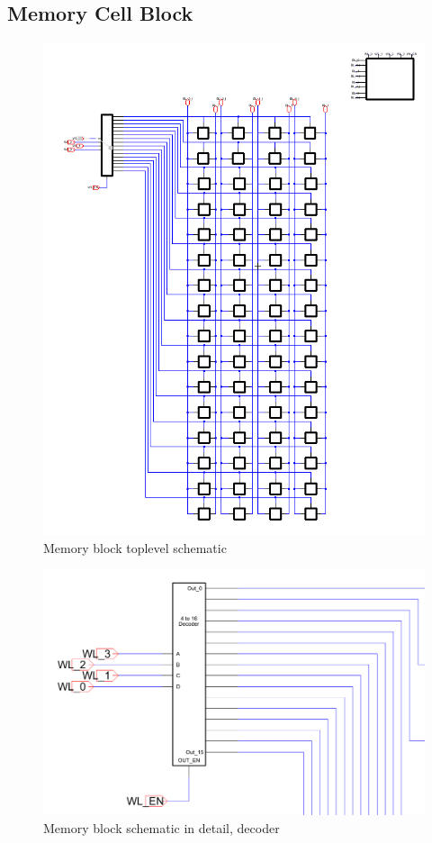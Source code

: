\documentclass[12pt]{report}
\begin{document}
\subsection*{Memory Cell Block}
\begin{figure}[H]
  \centering
    \includegraphics[width=1.0\textwidth]{Schematics/memory_block_allcomponents_schematic.PNG}
  \caption{Memory block toplevel schematic}
  \label{fig:memory_block_allcomponents_schematic}
\end{figure}
\begin{figure}[H]
  \centering
    \includegraphics[width=1.0\textwidth]{Schematics/memory_block_decoder_schematic.PNG}
  \caption{Memory block schematic in detail, decoder}
  \label{fig:memory_block_decoder_schematic}
\end{figure}
\end{document}
